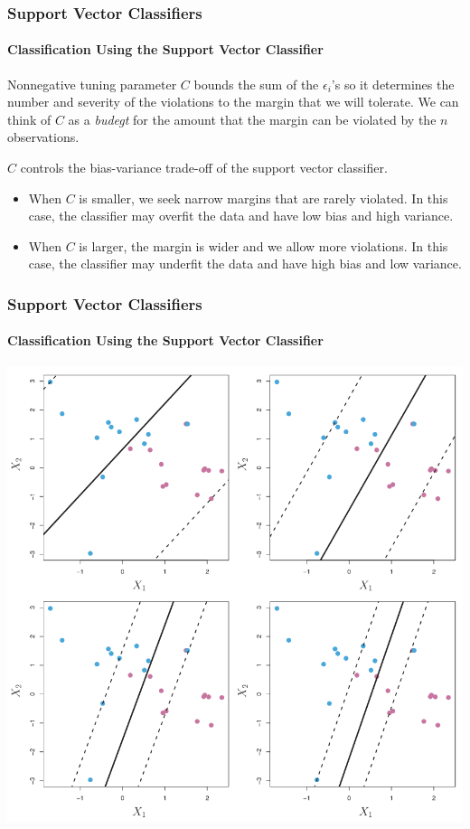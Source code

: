 \documentclass{beamer}
\begin{document}
\begin{frame}
    \frametitle{Support Vector Classifiers}
    \framesubtitle{Classification Using the Support Vector Classifier}
    \begin{block}{Nonnegative tuning parameter}
        $C$ bounds the sum of the $\epsilon_i$'s so it determines the number and severity of 
        the violations to the margin that we will tolerate. We can think of $C$ as a \textit{budegt} 
        for the amount that the margin can be violated by the $n$ observations.

        $C$ controls the bias-variance trade-off of the support vector classifier. 
        \begin{itemize}
            \item When $C$ is smaller, we seek narrow margins that are rarely violated. In this case, the classifier may overfit the data and have low bias and high variance.
            \item When $C$ is larger, the margin is wider and we allow more violations. In this case, the classifier may underfit the data and have high bias and low variance.
        \end{itemize}
    \end{block}
\end{frame}

\begin{frame}
    \frametitle{Support Vector Classifiers}
    \framesubtitle{Classification Using the Support Vector Classifier}
    \begin{center}
        \includegraphics[scale=0.3]{images/C.png}
    \end{center}
\end{frame}
\end{document}
